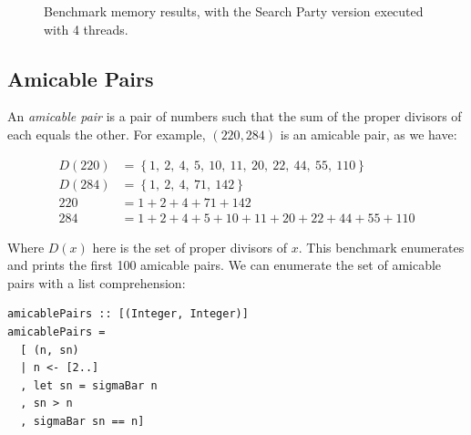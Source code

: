 \begin{figure}[t]


  \caption{Benchmark memory results, with the Search Party version
    executed with 4 threads.}
  \label{fig:examples-space}
\end{figure}

\subsection*{Amicable Pairs}
\label{sec:prelims-searchparty-examples-amis}

An \textit{amicable pair} is a pair of numbers such that the sum of
the proper divisors of each equals the other. For example, $(220,
284)$ is an amicable pair, as we have:

\begin{align*}
  D(220) &= \left\{1,~2,~4,~5,~10,~11,~20,~22,~44,~55,~110\right\}\\
  D(284) &= \left\{1,~2,~4,~71,~142\right\}\\
  220    &= 1 + 2 + 4 + 71 + 142\\
  284    &= 1 + 2 + 4 + 5 + 10 + 11 + 20 + 22 + 44 + 55 + 110
\end{align*}

Where $D(x)$ here is the set of proper divisors of $x$. This benchmark
enumerates and prints the first 100 amicable pairs. We can enumerate
the set of amicable pairs with a list comprehension:

\begin{verbatim}
amicablePairs :: [(Integer, Integer)]
amicablePairs =
  [ (n, sn)
  | n <- [2..]
  , let sn = sigmaBar n
  , sn > n
  , sigmaBar sn == n]
\end{verbatim}

